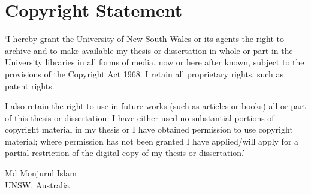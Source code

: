 
\chapter*{Copyright Statement}
\pagestyle{plain}

`I hereby grant the University of New South Wales or its agents the right to archive and to make available my thesis or dissertation in whole or part in the University libraries in all forms of media, now or here after known, subject to the provisions of the Copyright Act 1968. I retain all proprietary rights, such as patent rights.

\noindent I also retain the right to use in future works (such as articles or books) all or part of this thesis or dissertation. I have either used no substantial portions of copyright material in my thesis or I have obtained permission to use copyright material; where permission has not been granted I have applied/will apply for a partial restriction of the digital copy of my thesis or dissertation.'

\vspace{60pt}

\begin{flushright}
Md Monjurul Islam \\
UNSW, Australia
\end{flushright}

